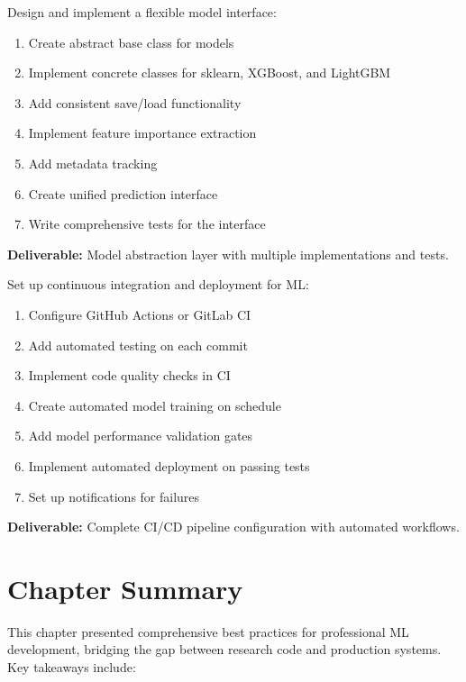 \begin{exercise}
Design and implement a flexible model interface:
\begin{enumerate}
    \item Create abstract base class for models
    \item Implement concrete classes for sklearn, XGBoost, and LightGBM
    \item Add consistent save/load functionality
    \item Implement feature importance extraction
    \item Add metadata tracking
    \item Create unified prediction interface
    \item Write comprehensive tests for the interface
\end{enumerate}
\textbf{Deliverable:} Model abstraction layer with multiple implementations and tests.
\end{exercise}

\begin{exercise}
Set up continuous integration and deployment for ML:
\begin{enumerate}
    \item Configure GitHub Actions or GitLab CI
    \item Add automated testing on each commit
    \item Implement code quality checks in CI
    \item Create automated model training on schedule
    \item Add model performance validation gates
    \item Implement automated deployment on passing tests
    \item Set up notifications for failures
\end{enumerate}
\textbf{Deliverable:} Complete CI/CD pipeline configuration with automated workflows.
\end{exercise}

\section{Chapter Summary}

This chapter presented comprehensive best practices for professional ML development, bridging the gap between research code and production systems. Key takeaways include:

